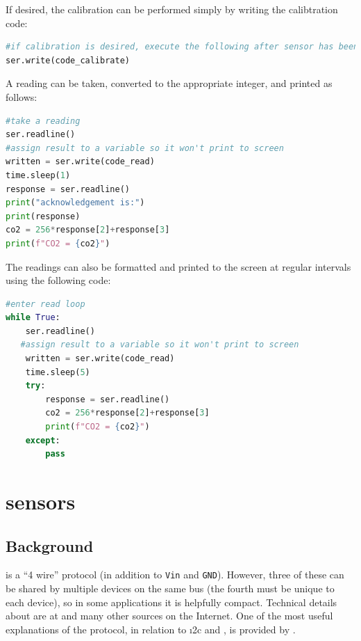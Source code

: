 If desired, the calibration can be performed simply by writing the calibtration code:
\begin{lstlisting}[language=Python]
#if calibration is desired, execute the following after sensor has been sitting in outdoor air for 20 minutes
ser.write(code_calibrate)
\end{lstlisting}

A reading can be taken, converted to the appropriate integer, and printed as follows:

\begin{lstlisting}[language=Python]
#take a reading
ser.readline()
#assign result to a variable so it won't print to screen
written = ser.write(code_read) 
time.sleep(1)
response = ser.readline()
print("acknowledgement is:")
print(response)
co2 = 256*response[2]+response[3]
print(f"CO2 = {co2}")
\end{lstlisting}

The readings can also be formatted and printed to the screen at regular intervals using the following code:

\begin{lstlisting}[language=Python]
#enter read loop
while True:
    ser.readline()
   #assign result to a variable so it won't print to screen
    written = ser.write(code_read) 
    time.sleep(5)
    try:
        response = ser.readline()
        co2 = 256*response[2]+response[3]
        print(f"CO2 = {co2}")
    except:
        pass
\end{lstlisting}

\newpage



\section{\spi sensors}
\subsection{Background}
\spi is a ``4 wire'' protocol (in addition to \texttt{Vin} and \texttt{GND}).
However, three of these can be shared by multiple devices on the same \spi bus (the fourth must be unique to each device), so in some applications it is helpfully compact.
Technical details about \spi are at  and many other sources on the Internet.
One of the most useful explanations of the \spi protocol, in relation to \i2c and \uart, is provided by .


